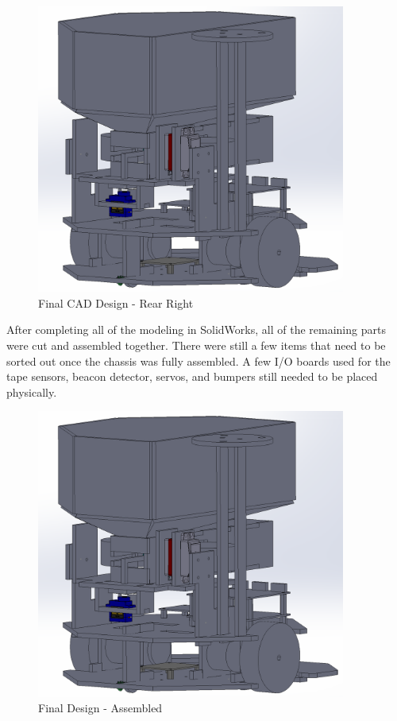\documentclass{article}
\begin{document}
\begin{figure}[H]
    \centering
    \includegraphics[width = 4in]{FinalCad4.PNG}
    \caption{Final CAD Design - Rear Right}
    \label{fig:FinalCad4}
\end{figure}

After completing all of the modeling in SolidWorks, all of the remaining parts were cut and assembled together. There were still a few items that need to be sorted out once the chassis was fully assembled. A few I/O boards used for the tape sensors, beacon detector, servos, and bumpers still needed to be placed physically.

\begin{figure}[H]
    \centering
    \includegraphics[width = 4in]{FinalCad4.PNG}
    \caption{Final Design - Assembled}
    \label{fig:M1N-5P3CAssembled}
\end{figure}
\end{document}
